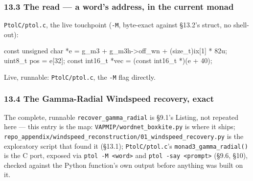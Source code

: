 \documentclass[
  10pt,
]{article}
\newenvironment{Shaded}{}{}
\newcommand{\BuiltInTok}[1]{\textcolor[rgb]{0.00,0.50,0.00}{#1}}
\newcommand{\DataTypeTok}[1]{\textcolor[rgb]{0.56,0.13,0.00}{#1}}
\newcommand{\DecValTok}[1]{\textcolor[rgb]{0.25,0.63,0.44}{#1}}
\newcommand{\NormalTok}[1]{#1}
\newcommand{\OperatorTok}[1]{\textcolor[rgb]{0.40,0.40,0.40}{#1}}
\begin{document}
\hypertarget{the-read-a-words-address-in-the-current-monad}{%
\subsubsection{13.3 The read --- a word's address, in the current
monad}\label{the-read-a-words-address-in-the-current-monad}}

\texttt{PtolC/ptol.c}, the live touchpoint (\texttt{-M}, byte-exact
against §13.2's struct, no shell-out):

\begin{Shaded}
\begin{Highlighting}[]
\DataTypeTok{const} \DataTypeTok{unsigned} \DataTypeTok{char} \OperatorTok{*}\NormalTok{e }\OperatorTok{=}\NormalTok{ g\_m3 }\OperatorTok{+}\NormalTok{ g\_m3h}\OperatorTok{{-}\textgreater{}}\NormalTok{off\_wn }\OperatorTok{+} \OperatorTok{(}\DataTypeTok{size\_t}\OperatorTok{)}\NormalTok{ix}\OperatorTok{[}\DecValTok{1}\OperatorTok{]} \OperatorTok{*} \DecValTok{82}\BuiltInTok{u}\OperatorTok{;}
\DataTypeTok{uint8\_t}\NormalTok{ pos }\OperatorTok{=}\NormalTok{ e}\OperatorTok{[}\DecValTok{32}\OperatorTok{];}
\DataTypeTok{const} \DataTypeTok{int16\_t} \OperatorTok{*}\NormalTok{vec }\OperatorTok{=} \OperatorTok{(}\DataTypeTok{const} \DataTypeTok{int16\_t} \OperatorTok{*)(}\NormalTok{e }\OperatorTok{+} \DecValTok{40}\OperatorTok{);}
\end{Highlighting}
\end{Shaded}

Live, runnable: \texttt{PtolC/ptol.c}, the \texttt{-M} flag directly.

\hypertarget{the-gamma-radial-windspeed-recovery-exact}{%
\subsubsection{13.4 The Gamma-Radial Windspeed recovery,
exact}\label{the-gamma-radial-windspeed-recovery-exact}}

The complete, runnable \texttt{recover\_gamma\_radial} is §9.1's
Listing, not repeated here --- this entry is the map:
\texttt{VAPMIP/wordnet\_boxkite.py} is where it ships;
\texttt{repo\_appendix/windspeed\_reconstruction/01\_windspeed\_recovery.py}
is the exploratory script that found it (§13.1); \texttt{PtolC/ptol.c}'s
\texttt{monad3\_gamma\_radial()} is the C port, exposed via
\texttt{ptol\ -M\ \textless{}word\textgreater{}} and
\texttt{ptol\ -say\ \textless{}prompt\textgreater{}} (§9.6, §10),
checked against the Python function's own output before anything was
built on it.
\end{document}
